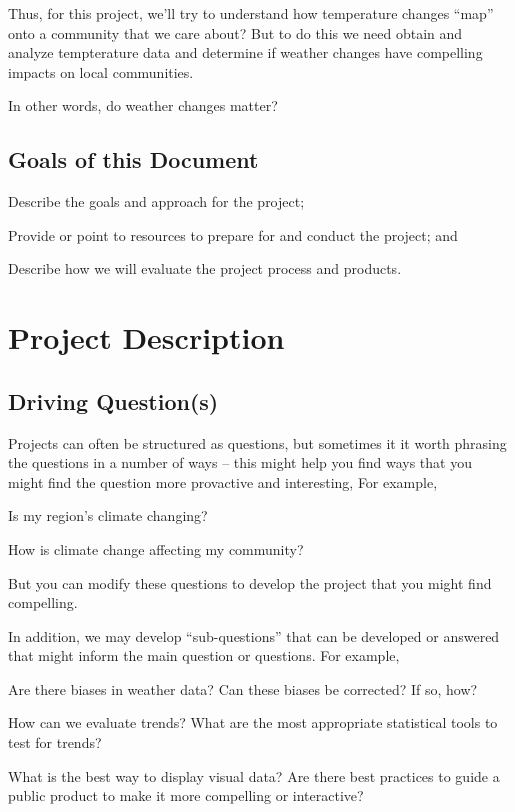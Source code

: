 \documentclass{article}\usepackage[]{graphicx}\usepackage[]{color}
\newenvironment{itemize*}%
  {\begin{itemize}%
    \setlength{\itemsep}{0pt}%
    \setlength{\parskip}{0pt}}%
  {\end{itemize}}
\newenvironment{enumerate*}%
  {\begin{enumerate}%
    \setlength{\itemsep}{0pt}%
    \setlength{\parskip}{0pt}}%
  {\end{enumerate}}
\begin{document}
Thus, for this project, we'll try to understand how temperature changes ``map'' onto a community that we care about? But to do this we need obtain and analyze tempterature data and determine if weather changes have compelling impacts on local communities.

In other words, do weather changes matter?

\subsection{Goals of this Document}

\begin{enumerate*}
  \item Describe the goals and approach for the project;
  \item Provide or point to resources to prepare for and conduct the project; and
  \item Describe how we will evaluate the project process and products.
\end{enumerate*}

\section{Project Description}

\subsection{Driving Question(s)}

Projects can often be structured as questions, but sometimes it it worth phrasing the questions in a number of ways -- this might help you find ways that you might find the question more provactive and interesting, For example,

\begin{itemize*}
  \item Is my region's climate changing?
  \item How is climate change affecting my community?
\end{itemize*}

But you can modify these questions to develop the project that you might find compelling.

In addition, we may develop ``sub-questions'' that can be developed or answered that might inform the main question or questions. For example, 

\begin{itemize*}
  \item Are there biases in weather data? Can these biases be corrected? If so, how?
  \item How can we evaluate trends? What are the most appropriate statistical tools to test for trends?
  \item What is the best way to display visual data?  Are there best practices to guide a public product to make it more compelling or interactive?
\end{itemize*}
\end{document}
